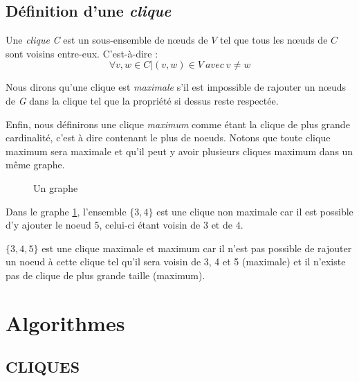 \documentclass[a4paper, 12pt]{article}
\begin{document}
\subsection{Définition d'une \textit{clique}}

Une \textit{clique} \emph{C} est un sous-ensemble de nœuds de $ V $ tel que tous les nœuds de $ C $ sont voisins entre-eux. C'est-à-dire :
$$ \forall v, w \in C | (v, w)\in V \ avec\  v \neq w$$

Nous dirons qu'une clique est \textit{maximale} s'il est impossible de rajouter un nœuds de \emph{G} dans la clique tel que la propriété si dessus reste respectée.

Enfin, nous définirons une clique \textit{maximum} comme étant la clique de plus grande cardinalité, c'est à dire contenant le plus de noeuds. Notons que toute clique maximum sera maximale et qu'il peut y avoir plusieurs cliques maximum dans un même graphe.

\begin{figure}[h]
  \begin{center}
\caption{Un graphe}
  \label{fig:x example graph}
\end{center}
\end{figure}

Dans le graphe \ref{fig:x example graph}, l'ensemble $ \{3, 4\} $ est une clique non maximale car il est possible d'y ajouter le noeud $ 5 $, celui-ci étant voisin de $ 3 $ et de $ 4 $.

$ \{3, 4, 5\}$ est une clique maximale et maximum car il n'est pas possible de rajouter un noeud à cette clique tel qu'il sera voisin de 3, 4 et 5 (maximale) et il n'existe pas de clique de plus grande taille (maximum).


\section{Algorithmes}

\subsection{CLIQUES}
\end{document}
